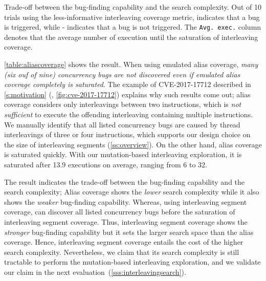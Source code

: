 %
\begin{table}[t]
  \small
  \centering
  
  \caption{Trade-off between the bug-finding capability and the search
    complexity. Out of 10 trials using the less-informative
    interleaving coverage metric, \checkmark\xspace indicates that a
    bug is triggered, while - indicates that a bug is not
    triggered. The \texttt{Avg. exec.}  column denotes that the
    average number of execution until the saturation of interleaving
    coverage.}
  \label{table:aliascoverage}
  \vspace{-8pt}
\end{table}
%
\autoref{table:aliascoverage} shows the result.
%
When using emulated alias coverage, \textit{many (six ouf of nine)
concurrency bugs are not discovered even if emulated alias coverage
completely is saturated}.
%
The example of CVE-2017-17712 described in \autoref{s:motivation}
(\ie, \autoref{fig:cve-2017-17712}) explains why such results come 
out; alias coverage considers only interleavings between two
instructions, which is \textit{not sufficient} to execute the
offending interleaving containing multiple instructions. We manually 
identify that all
listed concurrency bugs are caused by thread interleavings of three or
four instructions, which supports our design choice on the size of
interleaving segments (\autoref{ss:overview}).
%
On the other hand, alias coverage is saturated quickly. With
our mutation-based interleaving exploration, it is saturated after 13.9
executions on average, ranging from 6 to 32.
%

The result indicates the trade-off between the bug-finding
capability and the search complexity; Alias coverage shows the
\textit{lower} search complexity while it also shows the \textit{weaker}
bug-finding capability.
%
Whereas, using interleaving segment coverage, \sys can discover all listed
concurrency bugs before the saturation of interleaving
segment coverage. Thus, interleaving segment coverage shows the
\textit{stronger} bug-finding capability but it sets the larger search 
space than the alias coverage.
Hence, interleaving segment coverage entails the cost of the
higher search complexity. Nevertheless, we claim that 
its search complexity is still tractable to perform the mutation-based 
interleaving exploration, and we validate our claim  in the next
evaluation~(\autoref{sss:interleavingsearch}).






